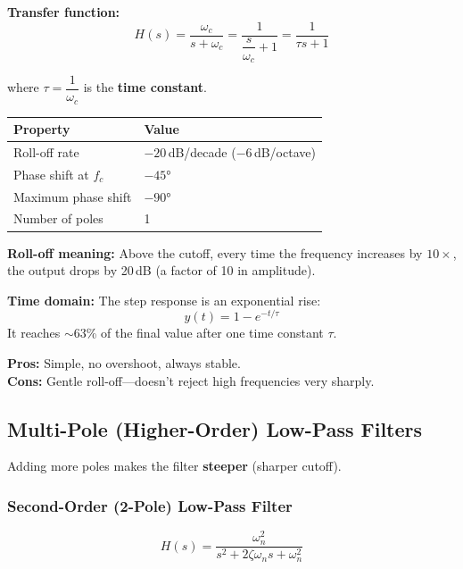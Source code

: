 \documentclass[12pt,a4paper]{article}
\begin{document}
\textbf{Transfer function:}
\begin{equation}
    H(s) = \frac{\omega_c}{s + \omega_c}
         = \frac{1}{\dfrac{s}{\omega_c} + 1}
         = \frac{1}{\tau s + 1}
\end{equation}

where $\tau = \dfrac{1}{\omega_c}$ is the \textbf{time constant}.

\begin{keybox}
\centering
\begin{tabular}{ll}
    \toprule
    \textbf{Property} & \textbf{Value} \\
    \midrule
    Roll-off rate           & $-20$\,dB/decade ($-6$\,dB/octave) \\
    Phase shift at $f_c$    & $-45°$ \\
    Maximum phase shift     & $-90°$ \\
    Number of poles         & 1 \\
    \bottomrule
\end{tabular}
\end{keybox}

\textbf{Roll-off meaning:} Above the cutoff, every time the frequency increases by $10\times$, the output drops by 20\,dB (a factor of 10 in amplitude).

\textbf{Time domain:} The step response is an exponential rise:
\begin{equation}
    y(t) = 1 - e^{-t/\tau}
\end{equation}
It reaches $\sim$63\% of the final value after one time constant $\tau$.

\textbf{Pros:} Simple, no overshoot, always stable. \\
\textbf{Cons:} Gentle roll-off---doesn't reject high frequencies very sharply.

\subsection{Multi-Pole (Higher-Order) Low-Pass Filters}

Adding more poles makes the filter \textbf{steeper} (sharper cutoff).

\subsubsection{Second-Order (2-Pole) Low-Pass Filter}

\begin{equation}
    H(s) = \frac{\omega_n^2}{s^2 + 2\zeta\omega_n s + \omega_n^2}
\end{equation}
\end{document}
